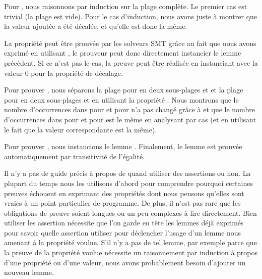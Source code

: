 Pour , nous raisonnons par induction sur la
plage complète. Le premier cas est trivial (la plage est vide). Pour le cas
d'induction, nous avons juste à montrer que la valeur ajoutée a été décalée, et
qu'elle est donc la même.


La propriété  peut être prouvée par les
solveurs SMT grâce au fait que nous avons exprimé  en
utilisant , le prouveur peut donc directement instancier le
lemme précédent. Si ce n'est pas le cas, la preuve peut être réalisée en
instanciant  avec la valeur 0 pour la
propriété de décalage.


Pour prouver , nous séparons la plage
pour  en deux sous-plages  et
 et la plage pour  en deux sous-plages
 et  en utilisant la propriété
. Nous montrons que le nombre d'occurrences
dans  pour  et 
pour  n'a pas changé grâce à 
et que le nombre d'occurrences dans  pour
 et  pour  est le même
en analysant par cas (et en utilisant le fait que la valeur correspondante est
la même).


Pour prouver , nous instancions le lemme
. Finalement, le lemme
 est prouvée automatiquement par transitivité
de l'égalité.




Il n'y a pas de guide précis à propos de quand utiliser des assertions ou non.
La plupart du temps nous les utilisons d'abord pour comprendre pourquoi certaines
preuves échouent en exprimant des propriétés dont nous pensons qu'elles sont vraies
à un point particulier de programme. De plus, il n'est pas rare que les obligations
de preuve soient longues ou un peu complexes à lire directement. Bien utiliser les
assertion nécessite que l'on garde en tête les lemmes déjà exprimés pour savoir
quelle assertion utiliser pour déclencher l'usage d'un lemme nous amenant à la
propriété voulue. S'il n'y a pas de tel lemme, par exemple parce que la preuve
de la propriété voulue nécessite un raisonnement par induction à propos d'une
propriété ou d'une valeur, nous avons probablement besoin d'ajouter un nouveau
lemme.



